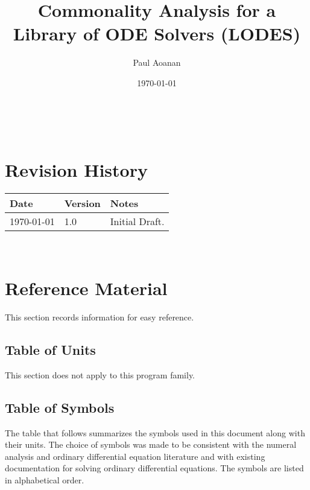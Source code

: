 \documentclass[12pt]{article}
\newcommand{\famname}{LODES} %
\newcommand{\famdesc}{Library of ODE Solvers}
\begin{document}
\title{Commonality Analysis for a \famdesc{} (\famname{})} 
\author{Paul Aoanan}
\date{\today}

\maketitle

~\newpage


\section{Revision History}

\begin{tabularx}{\textwidth}{p{3cm}p{2cm}X}
\toprule {\bf Date} & {\bf Version} & {\bf Notes}\\
\midrule
\today & 1.0 & Initial Draft.\\
\bottomrule
\end{tabularx}

~\newpage
	
\section{Reference Material}

This section records information for easy reference.

\subsection{Table of Units}

This section does not apply to this program family.

\subsection{Table of Symbols}

The table that follows summarizes the symbols used in this document along with
their units.  The choice of symbols was made to be consistent with the numeral analysis
and ordinary differential equation literature and with existing documentation
for solving ordinary differential equations.  The symbols are listed in alphabetical order.
\end{document}
